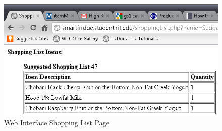 \documentclass[11pt]{article} %
\begin{document}
\begin{figure}[h!]
\vspace{0.5cm}
\begin{center}
\includegraphics[scale=0.45]{../graphics/webInterfaceShoppingList}
\caption{Web Interface Shopping List Page}
\label{web2}
\end{center}
\end{figure}
\end{document}
